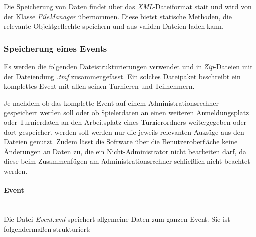 \documentclass[11pt]{article}
\newcommand{\subsubsubsection}[1]{\paragraph{#1}\mbox{}\\}
\begin{document}
Die Speicherung von Daten findet über das \textit{XML}-Dateiformat statt und wird von der Klasse \textit{FileManager} übernommen. Diese bietet statische Methoden, die relevante Objektgeflechte speichern und aus validen Dateien laden kann.

\subsubsection{Speicherung eines Events}

Es werden die folgenden Dateistrukturierungen verwendet und in \textit{Zip}-Dateien mit der Dateiendung \textit{.tmf} zusammengefasst. Ein solches Dateipaket beschreibt ein komplettes Event mit allen seinen Turnieren und Teilnehmern.

Je nachdem ob das komplette Event auf einem Administrationsrechner gespeichert werden soll oder ob Spielerdaten an einen weiteren Anmeldungsplatz oder Turnierdaten an den Arbeitsplatz eines Turnierordners weitergegeben oder dort gespeichert werden soll werden nur die jeweils relevanten Auszüge aus den Dateien genutzt. Zudem lässt die Software über die Benutzeroberfläche keine Änderungen an Daten zu, die ein Nicht-Administrator nicht bearbeiten darf, da diese beim Zusammenfügen am Administrationsrechner schließlich nicht beachtet werden.

\subsubsubsection{Event}

Die Datei \textit{Event.xml} speichert allgemeine Daten zum ganzen Event. Sie ist folgendermaßen strukturiert:
\vspace{0.4cm}
\end{document}
